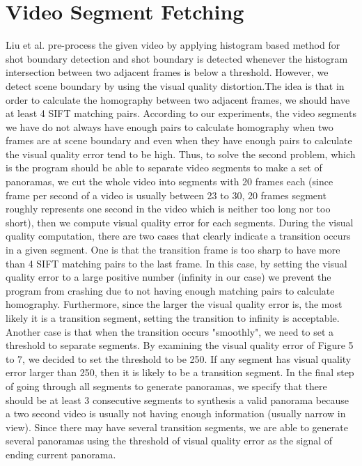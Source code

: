 \documentclass[12pt]{article}
\begin{document}
\section{Video Segment Fetching}
Liu et al.\cite{Liu} pre-process the given video by applying histogram based method for shot boundary detection and shot boundary is detected whenever the histogram intersection between two adjacent frames is below a threshold. 
However, we detect scene boundary by using the visual quality distortion.The idea is that in order to calculate the homography between two adjacent frames, we should have at least 4 SIFT matching pairs. According to our experiments, the video segments we have do not always have enough pairs to calculate homography when two frames are at scene boundary and even when they have enough pairs to calculate the visual quality error tend to be high. Thus, to solve the second problem, which is the program should be able to separate video segments to make a set of panoramas, we cut the whole video into segments with 20 frames each (since frame per second of a video is usually between 23 to 30, 20 frames segment roughly represents one second in the video which is neither too long nor too short), then we compute visual quality error for each segments. During the visual quality computation, there are two cases that clearly indicate a transition occurs in a given segment. One is that the transition frame is too sharp to have more than 4 SIFT matching pairs to the last frame. In this case, by setting the visual quality error to a large positive number (infinity in our case) we prevent the program from crashing due to not having enough matching pairs to calculate homography. Furthermore, since the larger the visual quality error is, the most likely it is a transition segment, setting the transition to infinity is acceptable. Another case is that when the transition occurs "smoothly", we need to set a threshold to separate segments. By examining the visual quality error of Figure 5 to 7, we decided to set the threshold to be 250. If any segment has visual quality error larger than 250, then it is likely to be a transition segment. In the final step of going through all segments to generate panoramas, we specify that there should be at least 3 consecutive segments to synthesis a valid panorama because a two second video is usually not having enough information (usually narrow in view). Since there may have several transition segments, we are able to generate several panoramas using the threshold of visual quality error as the signal of ending current panorama.
\end{document}
